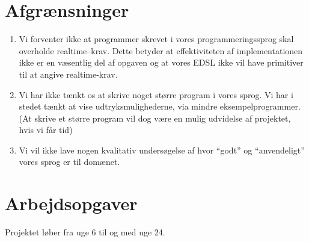 \documentclass[a4paper,oneside, draft]{memoir}
\begin{document}
\section{Afgrænsninger}
\begin{enumerate}
\item Vi forventer ikke at programmer skrevet i vores
  programmeringssprog skal overholde realtime--krav. Dette betyder at
  effektiviteten af implementationen ikke er en væsentlig del af
  opgaven og at vores EDSL ikke vil have primitiver til at angive
  realtime-krav.
\item Vi har ikke tænkt os at skrive noget større program i vores sprog. Vi har
  i stedet tænkt at vise udtryksmulighederne, via mindre eksempelprogrammer. (At
  skrive et større program vil dog være en mulig udvidelse af projektet, hvis vi
  får tid)
\item Vi vil ikke lave nogen kvalitativ undersøgelse af hvor "`godt"'
  og "`anvendeligt"' vores sprog er til domænet.
\end{enumerate}

\section{Arbejdsopgaver}

Projektet løber fra uge 6 til og med uge 24.
\end{document}
